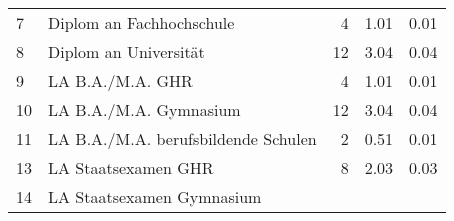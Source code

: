 \begin{longtable}{lXrrr}
     7 &
     \multicolumn{1}{X}{ Diplom an Fachhochschule   } &


       \num{4} &
       \num[round-mode=places,round-precision=2]{1.01} &
         \num[round-mode=places,round-precision=2]{0.01} \\

     8 &
     \multicolumn{1}{X}{ Diplom an Universität   } &


       \num{12} &
       \num[round-mode=places,round-precision=2]{3.04} &
         \num[round-mode=places,round-precision=2]{0.04} \\

     9 &
     \multicolumn{1}{X}{ LA B.A./M.A. GHR   } &


       \num{4} &
       \num[round-mode=places,round-precision=2]{1.01} &
         \num[round-mode=places,round-precision=2]{0.01} \\

     10 &
     \multicolumn{1}{X}{ LA B.A./M.A. Gymnasium   } &


       \num{12} &
       \num[round-mode=places,round-precision=2]{3.04} &
         \num[round-mode=places,round-precision=2]{0.04} \\

     11 &
     \multicolumn{1}{X}{ LA B.A./M.A. berufsbildende Schulen   } &


       \num{2} &
       \num[round-mode=places,round-precision=2]{0.51} &
         \num[round-mode=places,round-precision=2]{0.01} \\

     13 &
     \multicolumn{1}{X}{ LA Staatsexamen GHR   } &


       \num{8} &
       \num[round-mode=places,round-precision=2]{2.03} &
         \num[round-mode=places,round-precision=2]{0.03} \\

     14 &
     \multicolumn{1}{X}{ LA Staatsexamen Gymnasium   } &



\end{longtable}
